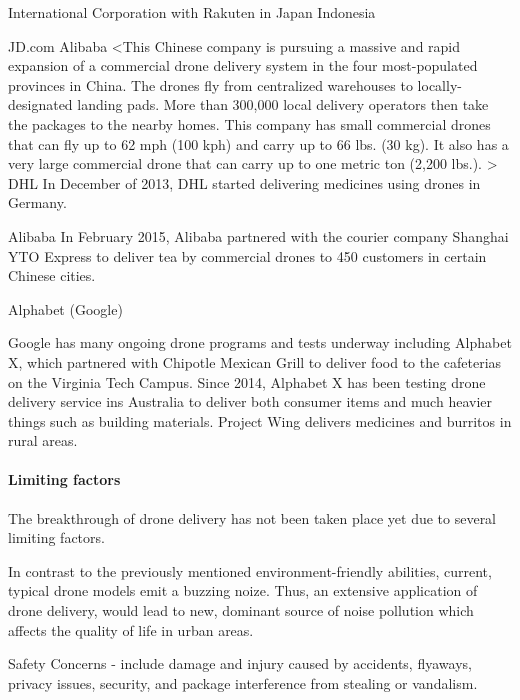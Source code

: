International
Corporation with Rakuten in Japan
Indonesia




JD.com
Alibaba
<This Chinese company is pursuing a massive and rapid expansion of a commercial drone delivery system in the four most-populated provinces in China. The drones fly from centralized warehouses to locally-designated landing pads. More than 300,000 local delivery operators then take the packages to the nearby homes. This company has small commercial drones that can fly up to 62 mph (100 kph) and carry up to 66 lbs. (30 kg). It also has a very large commercial drone that can carry up to one metric ton (2,200 lbs.). >
DHL
In December of 2013, DHL started delivering medicines using drones in Germany. 

Alibaba 
In February 2015, Alibaba partnered with the courier company Shanghai YTO Express to deliver tea by commercial drones to 450 customers in certain Chinese cities. 

Alphabet (Google) 

Google has many ongoing drone programs and tests underway including Alphabet X, which partnered with Chipotle Mexican Grill to deliver food to the cafeterias on the Virginia Tech Campus. Since 2014, Alphabet X has been testing drone delivery service ins Australia to deliver both consumer items and much heavier things such as building materials. Project Wing delivers medicines and burritos in rural areas. 





\paragraph{Limiting factors}
The breakthrough of drone delivery
has not been taken place yet due to several
limiting factors.

In contrast to the previously mentioned
environment-friendly abilities,
current, typical drone models emit a buzzing noize.
Thus, an extensive application of drone delivery,
would lead to new, dominant source of noise pollution 
which affects the quality of life in urban areas.



Safety Concerns - include damage and injury caused by 
accidents, 
flyaways, 
privacy issues, 
security, and 
package interference from stealing or vandalism. 

